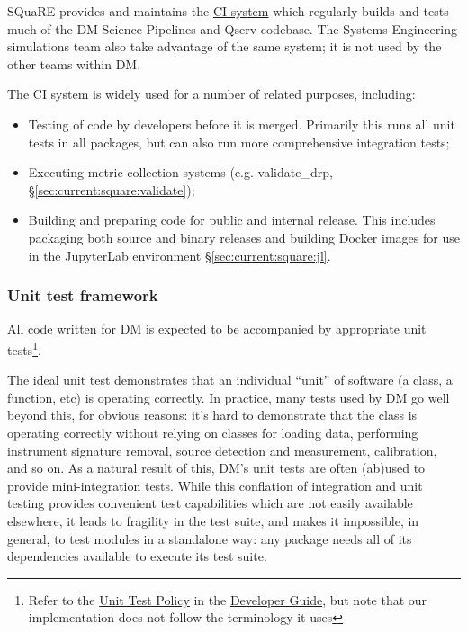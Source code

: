 \documentclass[DM,authoryear,toc,lsstdraft]{lsstdoc}
\begin{document}
SQuaRE provides and maintains the \href{https://ci.lsst.codes}{CI system}
which regularly builds and tests much of the DM Science Pipelines and Qserv
codebase. The Systems Engineering simulations team also take advantage of the
same system; it is not used by the other teams within DM.

The CI system is widely used for a number of related purposes, including:

\begin{itemize}

  \item{Testing of code by developers before it is merged. Primarily this runs
  all unit tests in all packages, but can also run more comprehensive
  integration tests;}
  \item{Executing \gls{metric} collection systems (e.g. validate\_drp,
  \S\ref{sec:current:square:validate});}
  \item{Building and preparing code for public and internal release. This includes
  packaging both source and binary releases and building Docker images for use in the
  JupyterLab environment \S\ref{sec:current:square:jl}.}

\end{itemize}

\subsubsection{Unit test framework}
\label{sec:current:square:unit}

All code written for DM is expected to be accompanied by appropriate unit
tests\footnote{Refer to the
\href{https://developer.lsst.io/coding/unit_test_policy.html}{Unit Test
Policy} in the \href{https://developer.lsst.io}{Developer Guide}, but note
that our implementation does not follow the terminology it uses}.

The ideal unit test demonstrates that an individual ``unit'' of software (a
class, a function, etc) is operating correctly. In practice, many tests used
by DM go well beyond this, for obvious reasons: it's hard to demonstrate that
the  class is operating correctly without relying on
classes for loading data, performing instrument signature removal, source
detection and measurement, calibration, and so on.  As a natural result of
this, DM's unit tests are often (ab)used to provide mini-integration tests.
While this conflation of integration and unit testing provides convenient test
capabilities which are not easily available elsewhere, it leads to fragility
in the test suite, and makes it impossible, in general, to test modules in a
standalone way: any package needs all of its dependencies available to execute
its test suite.
\end{document}
